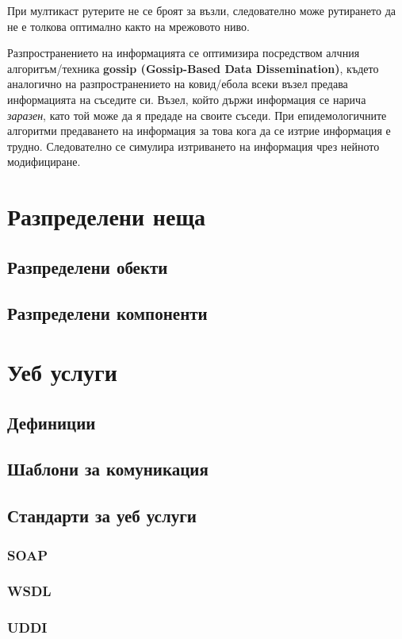 \documentclass[fleqn,12pt]{article}
\begin{document}
При мултикаст рутерите не се броят за възли, следователно може рутирането да не е толкова оптимално както на мрежовото ниво.
\bigbreak

Разпространението на информацията се оптимизира посредством алчния алгоритъм/техника \textbf{gossip (Gossip-Based Data Dissemination)}, където аналогично на разпространението на ковид/ебола всеки възел предава информацията на съседите си.
Възел, който държи информация се нарича \textit{заразен}, като той може да я предаде на своите съседи.
При епидемологичните алгоритми предаването на информация за това кога да се изтрие информация е трудно.
Следователно се симулира изтриването на информация чрез нейното модифициране.

\section{Разпределени неща}
\subsection{Разпределени обекти}
\subsection{Разпределени компоненти}

\section{Уеб услуги}
\subsection{Дефиниции}
\subsection{Шаблони за комуникация}
\subsection{Стандарти за уеб услуги}
\subsubsection{SOAP}
\subsubsection{WSDL}
\subsubsection{UDDI}
\end{document}
